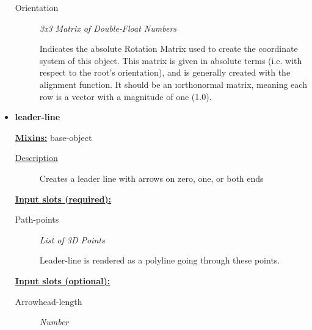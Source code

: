 \documentclass [11pt]{book}
\begin{document}
\begin{itemize}
\begin{description}
\item [Orientation]
\emph{3x3 Matrix of Double-Float Numbers}

 Indicates the absolute Rotation Matrix used to create
the coordinate system of this object. This matrix is given in absolute terms (i.e. with
respect to the root's orientation), and is generally created with the alignment function.
It should be an 
\i{orthonormal} matrix, meaning each row is a vector with a magnitude
of one (1.0).




\end{description}







\item {}
\label{prim:leader-line}
\textbf{leader-line}


\textbf{
\underline{Mixins:}} base-object





\begin{description}

\item [
\underline{Description}]


Creates a leader line with arrows on zero, one, or both ends



\end{description}








\textbf{
\underline{Input slots (required):}}

\begin{description}

\item [Path-points]
\emph{List of 3D Points}

 Leader-line is rendered as a polyline going through these points.




\end{description}






\textbf{
\underline{Input slots (optional):}}

\begin{description}

\item [Arrowhead-length]
\emph{Number}


\end{description}
\end{itemize}
\end{document}
